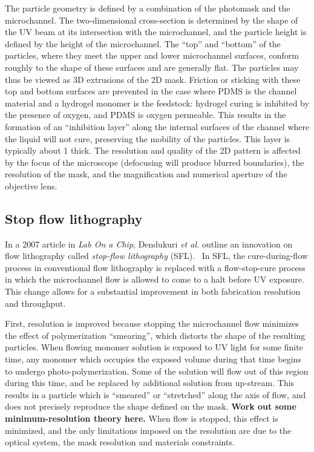 The particle geometry is defined by a combination of the photomask and the microchannel.  The two-dimensional cross-section
is determined by the shape of the UV beam at its intersection with the microchannel, and the particle height is defined by
the height of the microchannel. The ``top'' and ``bottom'' of the particles, where they meet the upper and lower
microchannel surfaces, conform roughly to the shape of these surfaces and are generally flat.
The particles may thus be viewed as 3D extrusions of the 2D mask.  Friction or sticking with these top and bottom
surfaces are prevented in the case where PDMS is the channel material and a hydrogel monomer is the feedstock: hydrogel
curing is inhibited by the presence of oxygen, and PDMS is oxygen permeable. This results in the formation of an 
``inhibition layer'' along the internal surfaces of the channel where the liquid will not cure, preserving the mobility 
of the particles. This layer is typically about 1 \microns thick.
The resolution and quality of the 2D pattern 
is affected by the focus of the microscope (defocusing will produce blurred boundaries), the resolution of the mask,
and the magnification and numerical aperture of the objective lens.  

\subsection{Stop flow lithography}
\label{sec:SFL}

In a 2007 article in \textit{Lab On a Chip}, Dendukuri \textit{et al.} outline an innovation on flow lithography
called \textit{stop-flow lithography} (SFL).~\cite{dendukuri-sfl} In SFL, the cure-during-flow
 
process in conventional flow lithography is replaced with a flow-stop-cure process in which the microchannel flow
is allowed to come to a halt before UV exposure. This change allows for a substantial improvement in both 
fabrication resolution and throughput.

First, resolution is improved because stopping the microchannel flow minimizes the effect of polymerization
``smearing'', which distorts the shape of the resulting particles.
When flowing monomer solution is exposed to UV light for some finite time, any monomer which occupies the exposed volume 
during that time begins to undergo photo-polymerization.  Some of the solution will flow out of this region 
during this time, and be replaced by additional solution from up-stream. This results in a particle which is ``smeared''
or ``stretched'' along the axis of flow, and does not precisely reproduce the shape defined on the mask.  
\textbf{Work out some minimum-resolution theory here.}
When flow is 
stopped, this effect is minimized, and the only limitations imposed on the resolution are due to the optical system,
the mask resolution and materials constraints.

